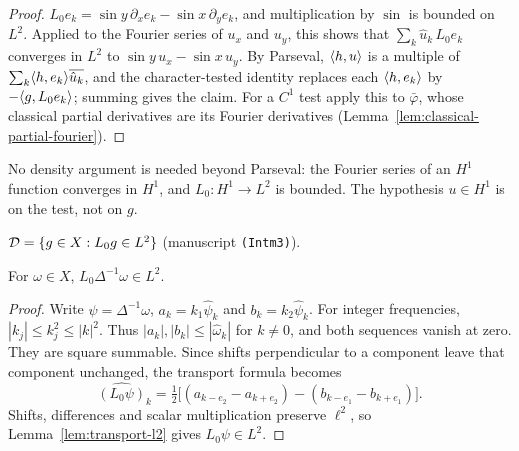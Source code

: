 \begin{proof}
\leanok
$L_0e_k=\sin y\,\partial_xe_k-\sin x\,\partial_ye_k$, and multiplication by $\sin$ is
bounded on $L^2$. Applied to the Fourier series of $u_x$ and $u_y$, this shows that
$\sum_k\hat u_k\,L_0e_k$ converges in $L^2$ to $\sin y\,u_x-\sin x\,u_y$. By
Parseval, $\langle h,u\rangle$ is a multiple of $\sum_k\langle h,e_k\rangle\overline{\hat u_k}$, and the
character-tested identity replaces each $\langle h,e_k\rangle$ by $-\langle g,L_0e_k\rangle$; summing gives
the claim. For a $C^1$ test apply this to $\bar\varphi$, whose classical partial derivatives
are its Fourier derivatives (Lemma~\ref{lem:classical-partial-fourier}).
\end{proof}

\begin{remark}
No density argument is needed beyond Parseval: the Fourier series of an $H^1$ function
converges in $H^1$, and $L_0:H^1\to L^2$ is bounded. The hypothesis $u\in H^1$ is on the
test, not on $g$.
\end{remark}

\begin{definition}
\label{def:domain}
\leanok
$\mathcal{D}=\{g\in X: L_0g\in L^2\}$ (manuscript \texttt{(Intm3)}).
\end{definition}

\begin{lemma}
\label{lem:L0-stream}
\leanok
For $\omega\in X$, $L_0\Delta^{-1}\omega\in L^2$.
\end{lemma}

\begin{proof}
\leanok
Write $\psi=\Delta^{-1}\omega$, $a_k=k_1\hat\psi_k$ and $b_k=k_2\hat\psi_k$.
For integer frequencies, $|k_j|\le k_j^2\le|k|^2$. Thus
$|a_k|,|b_k|\le|\hat\omega_k|$ for $k\ne0$, and both sequences vanish at zero.
They are square summable. Since shifts perpendicular to a component leave
that component unchanged, the transport formula becomes
\[
 \widehat{(L_0\psi)}_k
 =\tfrac12\big[(a_{k-e_2}-a_{k+e_2})-(b_{k-e_1}-b_{k+e_1})\big].
\]
Shifts, differences and scalar multiplication preserve $\ell^2$, so
Lemma~\ref{lem:transport-l2} gives $L_0\psi\in L^2$.
\end{proof}

